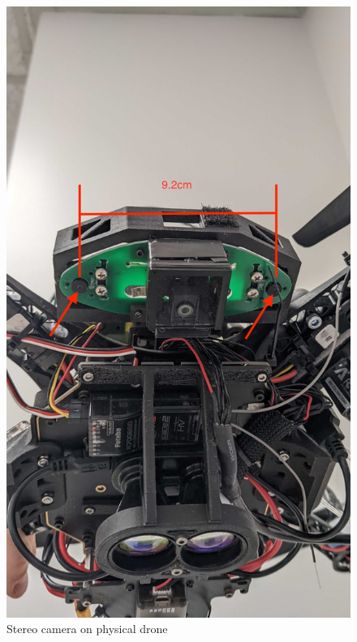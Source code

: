 \begin{figure}[h]
    \centering
    \includegraphics[scale=0.15]{images/appendix/Drone/stereo_cam.jpg}
    \caption{Stereo camera on physical drone}
    \label{fig:appendix_stereo_camera_hardware}
    \end{figure}